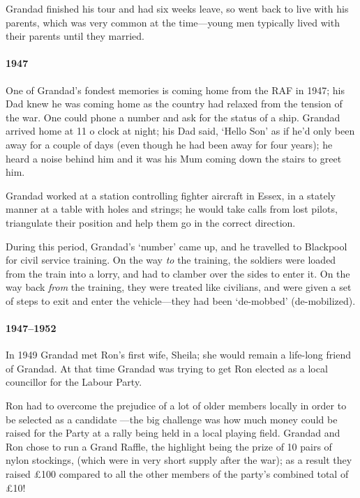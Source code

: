 Grandad finished his tour and had six weeks leave, so went back to live with his parents, which was
very common at the time---young men typically lived with their parents until they married.

\paragraph{1947} One of Grandad's fondest memories is coming home from the RAF in 1947; his Dad knew
he was coming home  as the country had relaxed from the tension of the war.
One could phone a number and ask for the status of a ship. Grandad arrived home at
11 o clock at night; his Dad said, `Hello Son' as if he'd only been away for
a couple of days (even though he had been away for four years); he heard a noise
behind him and it was his Mum coming down the stairs to greet him.

Grandad worked at a station controlling fighter aircraft in Essex, in a stately manner at a table
with holes and strings; he would take calls from lost pilots, triangulate their position
and help them go in the correct direction.

During this period, Grandad's `number' came up, and he travelled to Blackpool for
civil service training. On the way \emph{to} the training, the soldiers were loaded from
the train into a lorry, and had to clamber over the sides to enter it. On the
way back \emph{from} the training, they were treated like civilians, and were
given a set of steps to exit and enter the vehicle---they had been `de-mobbed' (de-mobilized).

\paragraph{1947--1952} In 1949 Grandad met Ron's first wife, Sheila; she would
remain a life-long friend of Grandad. At that time Grandad was trying to get Ron 
elected as a local councillor for the Labour Party.

Ron had to overcome the
prejudice of a lot of older members locally in order to be selected as a candidate ---the big challenge was
how much money could be raised for the Party at a rally being held
in a local playing field.
Grandad and Ron chose to run a Grand Raffle, the highlight being the
prize of 10 pairs of nylon stockings, (which were in very short supply
after the war); as a result they
raised \pounds100 compared to all the other members of the party's combined
total of \pounds10!

